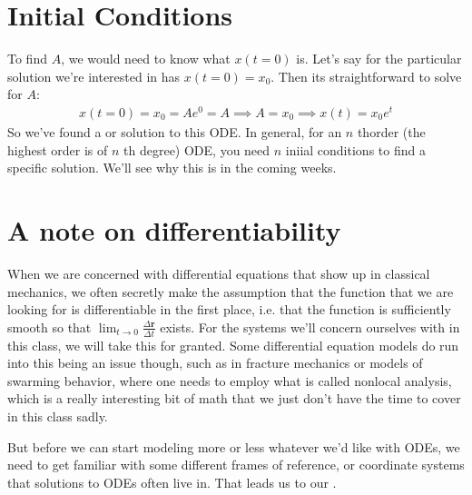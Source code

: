 \documentclass[letterpaper,10pt,english]{jupyterBook}
\begin{document}
\section{Initial Conditions}
\label{\detokenize{content/1_mechanics/mechanics_intro:initial-conditions}}
\sphinxAtStartPar
To find \(A\), we would need to know what \(x(t=0)\) is. Let’s say for the particular solution we’re interested in has \(x(t=0) = x_0\). Then its straightforward to solve for \(A\):
\begin{equation*}
\begin{split}
x(t=0) = x_0 = Ae^0 = A \implies A = x_0 \implies x(t) = x_0e^t
\end{split}
\end{equation*}
\sphinxAtStartPar
So we’ve found a  or  solution to this ODE. In general, for an \(n\) th\sphinxhyphen{}order (the highest order is of \(n\) th degree) ODE, you need \(n\) iniial conditions to find a specific solution. We’ll see why this is in the coming weeks.


\section{A note on differentiability}
\label{\detokenize{content/1_mechanics/mechanics_intro:a-note-on-differentiability}}
\sphinxAtStartPar
When we are concerned with differential equations that show up in classical mechanics, we often secretly make the assumption that the function that we are looking for is differentiable in the first place, i.e. that the function is sufficiently smooth so that \(\lim_{t\to 0} \frac{\Delta \mathbf{r}}{\Delta t}\) exists. For the systems we’ll concern ourselves with in this class, we will take this for granted. Some differential equation models do run into this being an issue though, such as in fracture mechanics or models of swarming behavior, where one needs to employ what is called nonlocal analysis, which is a really interesting bit of math that we just don’t have the time to cover in this class sadly.

\sphinxAtStartPar
But before we can start modeling more or less whatever we’d like with ODEs, we need to get familiar with some different frames of reference, or coordinate systems that solutions to ODEs often live in. That leads us to our .

\sphinxstepscope
\end{document}
